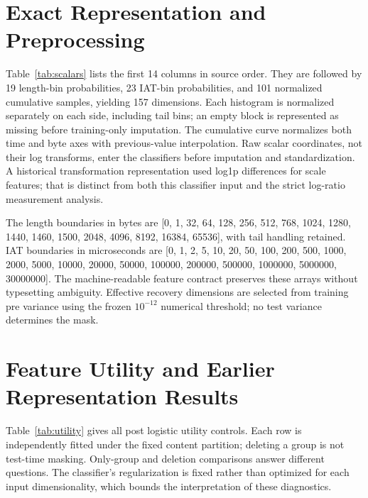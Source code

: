 \documentclass[journal]{IEEEtran}
\begin{document}
\section{Exact Representation and Preprocessing}
Table~\ref{tab:scalars} lists the first 14 columns in source order. They are followed by 19 length-bin probabilities, 23 IAT-bin probabilities, and 101 normalized cumulative samples, yielding 157 dimensions. Each histogram is normalized separately on each side, including tail bins; an empty block is represented as missing before training-only imputation. The cumulative curve normalizes both time and byte axes with previous-value interpolation. Raw scalar coordinates, not their log transforms, enter the classifiers before imputation and standardization. A historical transformation representation used log1p differences for scale features; that is distinct from both this classifier input and the strict log-ratio measurement analysis.

\begin{table}[t]\centering\caption{Scalar coordinates exported from the frozen representation code.}\label{tab:scalars}\small\end{table}

The length boundaries in bytes are [0, 1, 32, 64, 128, 256, 512, 768, 1024, 1280, 1440, 1460, 1500, 2048, 4096, 8192, 16384, 65536], with tail handling retained. IAT boundaries in microseconds are [0, 1, 2, 5, 10, 20, 50, 100, 200, 500, 1000, 2000, 5000, 10000, 20000, 50000, 100000, 200000, 500000, 1000000, 5000000, 30000000]. The machine-readable feature contract preserves these arrays without typesetting ambiguity. Effective recovery dimensions are selected from training pre variance using the frozen $10^{-12}$ numerical threshold; no test variance determines the mask.

\section{Feature Utility and Earlier Representation Results}
Table~\ref{tab:utility} gives all post logistic utility controls. Each row is independently fitted under the fixed content partition; deleting a group is not test-time masking. Only-group and deletion comparisons answer different questions. The classifier's regularization is fixed rather than optimized for each input dimensionality, which bounds the interpretation of these diagnostics.
\begin{table}[t]\centering\caption{Complete pooled utility controls.}\label{tab:utility}\small\end{table}
\end{document}
